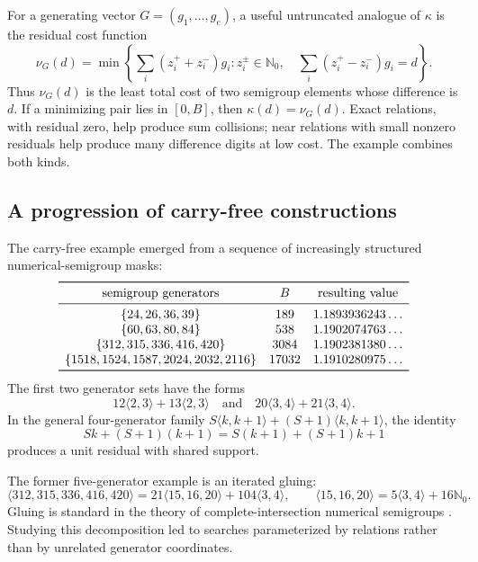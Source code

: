 \documentclass[11pt]{article}
\newcommand{\N}{\mathbb{N}_0}
\newcommand{\angles}[1]{\langle #1\rangle}
\begin{document}
For a generating vector $G=(g_1,\ldots,g_e)$, a useful untruncated analogue
of $\kappa$ is the residual cost function
\[
 \nu_G(d)=\min\left\{
 \sum_i(z_i^++z_i^-)g_i:
 z_i^\pm\in\N,\quad
 \sum_i(z_i^+-z_i^-)g_i=d
 \right\}.
\]
Thus $\nu_G(d)$ is the least total cost of two semigroup elements whose
difference is $d$.  If a minimizing pair lies in $[0,B]$, then
$\kappa(d)=\nu_G(d)$.  Exact relations, with residual zero, help produce
sum collisions; near relations with small nonzero residuals help produce
many difference digits at low cost.  The example combines both kinds.

\subsection{A progression of carry-free constructions}
The carry-free example emerged from a sequence of increasingly structured
numerical-semigroup masks:
\[
\begin{array}{c@{\quad}c@{\quad}c}
\toprule
\text{semigroup generators} & B & \text{resulting value}\\
\midrule
\{24,26,36,39\} & 189 & 1.1893936243\ldots\\
\{60,63,80,84\} & 538 & 1.1902074763\ldots\\
\{312,315,336,416,420\} & 3084 & 1.1902381380\ldots\\
\{1518,1524,1587,2024,2032,2116\} & 17032
 & 1.1910280975\ldots\\
\bottomrule
\end{array}
\]
The first two generator sets have the forms
\[
 12\angles{2,3}+13\angles{2,3}
 \quad\text{and}\quad
 20\angles{3,4}+21\angles{3,4}.
\]
In the general four-generator family
$S\angles{k,k+1}+(S+1)\angles{k,k+1}$, the identity
\[
 Sk+(S+1)(k+1)=S(k+1)+(S+1)k+1
\]
produces a unit residual with shared support.

The former five-generator example is an iterated gluing:
\[
 \angles{312,315,336,416,420}
 =21\angles{15,16,20}+104\angles{3,4},
\qquad
 \angles{15,16,20}=5\angles{3,4}+16\N.
\]
Gluing is standard in the theory of complete-intersection numerical
semigroups \cite{AssiGarciaSanchez2013,AssiGarciaOjeda2015}.
Studying this decomposition led to searches parameterized by relations
rather than by unrelated generator coordinates.
\end{document}

